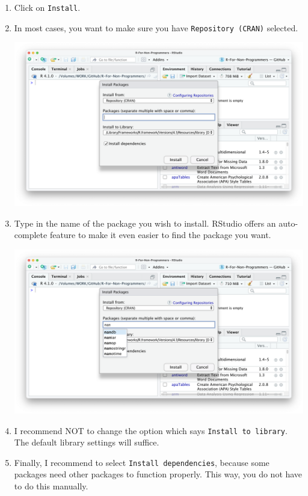 \documentclass[
  letterpaper,
]{krantz}
\begin{document}
\begin{enumerate}
\def\labelenumi{\arabic{enumi}.}
\item
  Click on \texttt{Install}.
\item
  In most cases, you want to make sure you have
  \texttt{Repository\ (CRAN)} selected.

  \includegraphics{images/chapter_05_img/install_r_packages/01_install_r_packages.png}
\item
  Type in the name of the package you wish to install. RStudio offers an
  auto-complete feature to make it even easier to find the package you
  want.

  \includegraphics{images/chapter_05_img/install_r_packages/02_install_r_packages.png}
\item
  I recommend NOT to change the option which says
  \texttt{Install\ to\ library}. The default library settings will
  suffice.
\item
  Finally, I recommend to select \texttt{Install\ dependencies}, because
  some packages need other packages to function properly. This way, you
  do not have to do this manually.


\end{enumerate}
\end{document}
